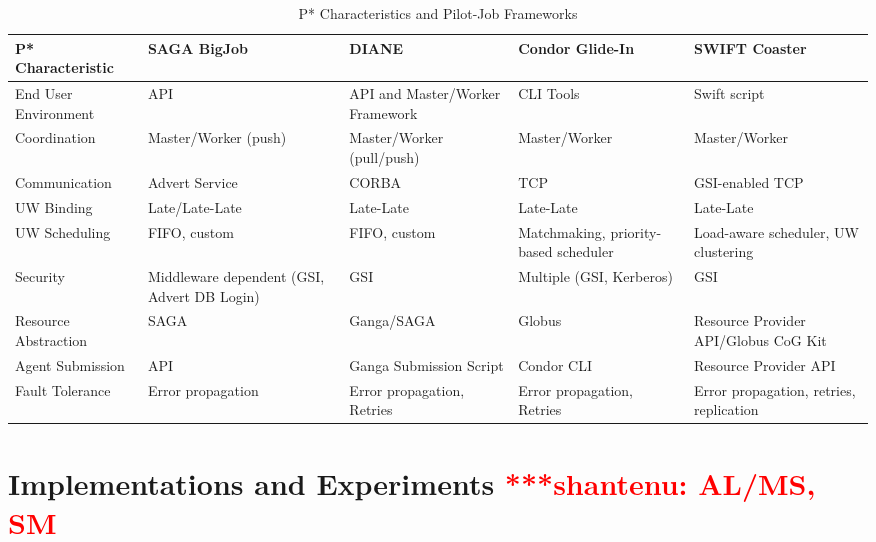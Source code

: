 \documentclass[conference,final]{IEEEtran}
\newcommand{\jhanote}[1]{ {\textcolor{red} { ***shantenu: #1 }}}
\newcommand{\jhanote}[1]{}
\begin{document}
\begin{table}[t]
\centering
\begin{tabular}{|l|p{2.5cm}|p{2.5cm}|p{2.5cm}|p{2.5cm}|}
	\hline
	\textbf{P* Characteristic}
	&\textbf{SAGA BigJob} &\textbf{DIANE} &\textbf{Condor Glide-In} &   
	\textbf{SWIFT Coaster} \\ \hline
End User Environment &API &API and Master/Worker Framework &CLI Tools &Swift script\\ \hline

Coordination &Master/Worker (push) &Master/Worker (pull/push) &Master/Worker &Master/Worker \\ \hline
	
Communication &Advert Service &CORBA &TCP &GSI-enabled TCP \\ \hline

UW Binding &Late/Late-Late &Late-Late &Late-Late &Late-Late\\
\hline
UW Scheduling &FIFO, custom &FIFO, custom &Matchmaking, priority-based scheduler 
&Load-aware scheduler, UW clustering\\
\hline

Security &Middleware dependent (GSI, Advert DB Login) &GSI &Multiple (GSI, 
Kerberos) &GSI\\ \hline

Resource Abstraction &SAGA &Ganga/SAGA &Globus &Resource Provider API/Globus CoG 
Kit \\ 
\hline
Agent Submission &API &Ganga Submission Script &Condor CLI 
&Resource Provider API\\
\hline
Fault Tolerance &Error propagation &Error propagation, Retries &Error propagation, Retries &Error propagation, retries, replication\\
\hline
	
\end{tabular}
\caption{P* Characteristics and Pilot-Job Frameworks}\label{table:pilot-job-comparison}
\end{table}

\section{Implementations and Experiments \jhanote{AL/MS, SM}}
\end{document}
